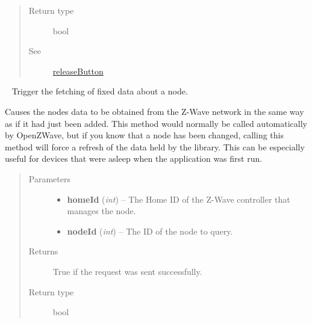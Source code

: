 \documentclass[letterpaper,10pt,english]{sphinxmanual}
\begin{document}
\begin{fulllineitems}
\begin{fulllineitems}
\begin{quote}
\begin{description}
\item[{Return type}] \leavevmode
bool

\item[{See}] \leavevmode
{\hyperref[libopenzwave:releasebutton]{releaseButton}}

\end{description}\end{quote}

\end{fulllineitems}


\begin{fulllineitems}
\label{libopenzwave:libopenzwave.PyManager.refreshNodeInfo}~\label{libopenzwave:refreshnodeinfo}
Trigger the fetching of fixed data about a node.

Causes the nodes data to be obtained from the Z-Wave network in the same way
as if it had just been added.  This method would normally be called
automatically by OpenZWave, but if you know that a node has been changed,
calling this method will force a refresh of the data held by the library.  This
can be especially useful for devices that were asleep when the application was
first run.
\begin{quote}\begin{description}
\item[{Parameters}] \leavevmode\begin{itemize}
\item {} 
\textbf{homeId} (\emph{int}) -- The Home ID of the Z-Wave controller that manages the node.

\item {} 
\textbf{nodeId} (\emph{int}) -- The ID of the node to query.

\end{itemize}

\item[{Returns}] \leavevmode
True if the request was sent successfully.

\item[{Return type}] \leavevmode
bool

\end{description}\end{quote}

\end{fulllineitems}



\end{fulllineitems}
\end{document}
